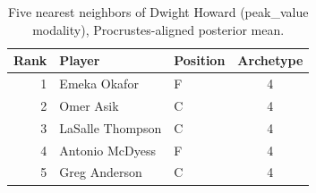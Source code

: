 \begin{table}[htbp]
  \centering\small
  \begin{tabular}{rllc}
    \toprule
    Rank & Player & Position & Archetype \\
    \midrule
    1 & Emeka Okafor & F & 4 \\
    2 & Omer Asik & C & 4 \\
    3 & LaSalle Thompson & C & 4 \\
    4 & Antonio McDyess & F & 4 \\
    5 & Greg Anderson & C & 4 \\
    \bottomrule
  \end{tabular}
  \caption{Five nearest neighbors of Dwight Howard (peak_value modality), Procrustes-aligned posterior mean.}
  \label{tab:Dwight_Howard_neighbors_peak_value}
\end{table}

